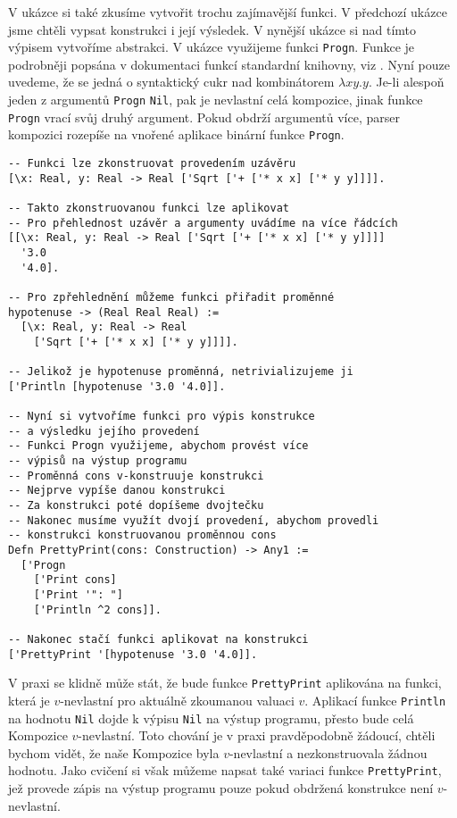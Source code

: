 V ukázce si také zkusíme vytvořit trochu zajímavější funkci. V předchozí ukázce jsme chtěli vypsat
konstrukci i její výsledek. V nynější ukázce si nad tímto výpisem vytvoříme abstrakci. V ukázce
využijeme funkci \lstinline{Progn}. Funkce je podrobněji popsána v dokumentaci funkcí standardní
knihovny, viz . Nyní pouze uvedeme, že se jedná o syntaktický cukr
nad kombinátorem $\lambda x y . y$. Je-li alespoň jeden z argumentů \lstinline{Progn} \lstinline{Nil},
pak je nevlastní celá kompozice, jinak funkce \lstinline{Progn} vrací svůj druhý argument. Pokud
obdrží argumentů více, parser kompozici rozepíše na vnořené aplikace binární funkce
\lstinline{Progn}.

\begin{lstlisting}[caption={Funkce a uzávěry}]
-- Funkci lze zkonstruovat provedením uzávěru
[\x: Real, y: Real -> Real ['Sqrt ['+ ['* x x] ['* y y]]]].

-- Takto zkonstruovanou funkci lze aplikovat
-- Pro přehlednost uzávěr a argumenty uvádíme na více řádcích
[[\x: Real, y: Real -> Real ['Sqrt ['+ ['* x x] ['* y y]]]]
  '3.0
  '4.0].

-- Pro zpřehlednění můžeme funkci přiřadit proměnné
hypotenuse -> (Real Real Real) :=
  [\x: Real, y: Real -> Real
    ['Sqrt ['+ ['* x x] ['* y y]]]].

-- Jelikož je hypotenuse proměnná, netrivializujeme ji
['Println [hypotenuse '3.0 '4.0]].

-- Nyní si vytvoříme funkci pro výpis konstrukce
-- a výsledku jejího provedení
-- Funkci Progn využijeme, abychom provést více
-- výpisů na výstup programu
-- Proměnná cons v-konstruuje konstrukci
-- Nejprve vypíše danou konstrukci
-- Za konstrukci poté dopíšeme dvojtečku
-- Nakonec musíme využít dvojí provedení, abychom provedli
-- konstrukci konstruovanou proměnnou cons
Defn PrettyPrint(cons: Construction) -> Any1 :=
  ['Progn
    ['Print cons]
    ['Print '": "]
    ['Println ^2 cons]].

-- Nakonec stačí funkci aplikovat na konstrukci
['PrettyPrint '[hypotenuse '3.0 '4.0]].
\end{lstlisting}

V praxi se klidně může stát, že bude funkce \lstinline{PrettyPrint} aplikována na funkci,
která je $v$-nevlastní pro aktuálně zkoumanou valuaci $v$. Aplikací funkce \lstinline{Println}
na hodnotu \lstinline{Nil} dojde k výpisu \lstinline{Nil} na výstup programu, přesto bude celá
Kompozice $v$-nevlastní. Toto chování je v praxi pravděpodobně žádoucí, chtěli bychom vidět, že naše
Kompozice byla $v$-nevlastní a nezkonstruovala žádnou hodnotu. Jako cvičení si však můžeme napsat
také variaci funkce \lstinline{PrettyPrint}, jež provede zápis na výstup programu pouze pokud
obdržená konstrukce není $v$-nevlastní.

